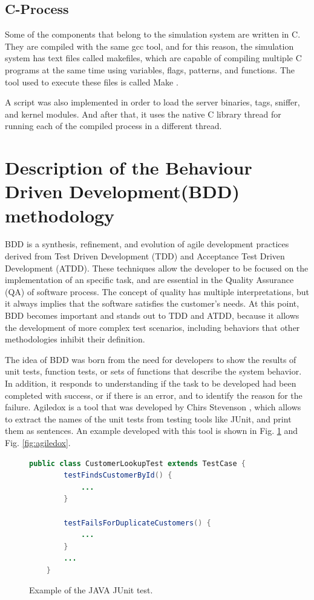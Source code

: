 \documentclass[journal]{IEEEtran}	%
\begin{document}
\subsection{C-Process}


Some of the components that belong to the simulation system are written in C. They are compiled with the same gcc tool, and for this reason, the simulation system has text files called makefiles, which are capable of compiling multiple C programs at the same time using variables, flags, patterns, and functions. The tool used to execute these files is called Make \cite{Make}.

A script was also implemented in order to load the server binaries, tags, sniffer, and kernel modules. And after that, it uses the native C library thread for running each of the compiled process in a different thread.


\section{Description of the Behaviour Driven Development(BDD) methodology}


BDD is a synthesis, refinement, and evolution of agile development practices derived from Test Driven Development (TDD) and Acceptance Test Driven Development (ATDD). These techniques allow the developer to be focused on the implementation of an specific task, and are essential in the Quality Assurance (QA) of software process. The concept of quality has multiple interpretations, but it always implies that the software satisfies the customer's needs. At this point, BDD becomes important and stands out to TDD and ATDD, because it allows the development of more complex test scenarios, including behaviors that other methodologies inhibit their definition.

The idea of BDD was born from the need for developers to show the results of unit tests, function tests, or sets of functions that describe the system behavior. In addition, it responds to understanding if the task to be developed had been completed with success, or if there is an error, and to identify the reason for the failure. Agiledox is a tool that was developed by Chirs Stevenson \cite{dannorth}, which allows to extract the names of the unit tests from testing tools like JUnit, and print them as sentences. An example developed with this tool is shown in Fig.  \ref*{fig:JUnitTest} and Fig. \ref*{fig:agiledox}.

\begin{figure}[t!]
\centering
\begin{lstlisting}[language=java]
    public class CustomerLookupTest extends TestCase {
        testFindsCustomerById() {
            ...
        }
        
        testFailsForDuplicateCustomers() {
            ...
        }
        ...
    }
\end{lstlisting}
\caption{Example of the JAVA JUnit test.}
\label{fig:JUnitTest}
\end{figure}
\end{document}
